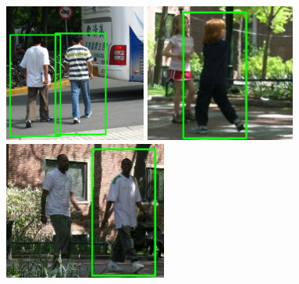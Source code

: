 \begin{figure}[H]
\centering
\includegraphics[keepaspectratio, max height=4.5cm,]{figures/ped/d/4}%
\hfill %
\includegraphics[keepaspectratio, max height=4.5cm,]{figures/ped/d/5}%
\hfill %
\includegraphics[keepaspectratio, max height=4.5cm,]{figures/ped/d/6}%
\end{figure}

